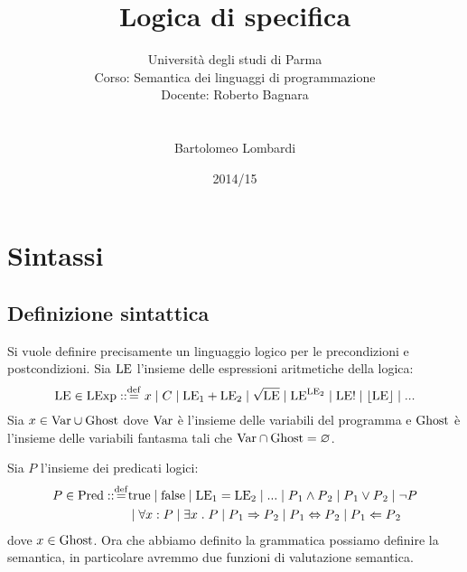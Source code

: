 \documentclass[a4paper, 12pt, oneside,fleqn]{book}
\begin{document}
\title{Logica di specifica}
\author{Università degli studi di Parma \\
Corso: Semantica dei linguaggi di programmazione \\
Docente: Roberto Bagnara \\\\\\
Bartolomeo Lombardi
}
\date{2014/15}
\maketitle
\tableofcontents

\newpage
\chapter{Sintassi}
\section{Definizione sintattica}
\theoremstyle{definition}
Si vuole definire precisamente un linguaggio logico per le precondizioni e postcondizioni. Sia $\mathrm{LE}$ l'insieme delle espressioni aritmetiche della logica:
$$\LE \in \LExp \itc\itc\defeq x \mid C \mid \LE{_1} + \LE{_2} \mid \sqrt{\LE} \mid \LE^{\LE{_2}} \mid \LE! \mid \lfloor \LE \rfloor \mid ...$$
Sia $x\in\mathrm{Var}\cup\mathrm{Ghost}$ dove $\mathrm{Var}$ è l'insieme delle variabili del programma e $\mathrm{Ghost}$ è l'insieme delle variabili fantasma tali che $\mathrm{Var}\cap\mathrm{Ghost} = \varnothing$.

Sia $P$ l'insieme dei predicati logici:
\begin{align*}
P \in \Pred \itc\itc\defeq &\true \mid\false\mid\LE{_1} = \LE{_2}\mid ...\mid P{_1} \wedge P{_2} \mid P{_1} \vee P{_2} \mid \neg P\\
&\mid \forall x \itc P\mid \exists x \st P\mid P{_1} \Rightarrow P{_2} \mid P{_1} \Leftrightarrow P{_2} \mid P{_1} \Leftarrow P{_2}
\end{align*}
dove $ x \in\mathrm{Ghost}$. Ora che abbiamo definito la grammatica possiamo definire la semantica, in particolare avremmo due funzioni di valutazione semantica.
\end{document}
